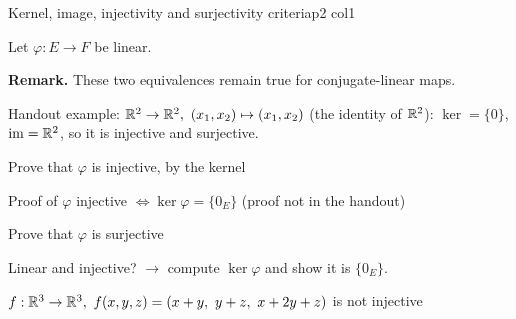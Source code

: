 \documentclass[course,noautoquant,noautokw]{neyvia-study}
\begin{document}
\begin{concept}[1.35]{Kernel, image, injectivity and surjectivity criteria}{p2 col1}
\begin{definition}
\noindent Let $\varphi:E\to F$ be linear.
\par\noindent \textbf{Remark.} These two equivalences remain true for conjugate-linear maps.
\par\noindent Handout example: $\R^2\to\R^2,\ (x_1,x_2)\mapsto(x_1,x_2)$ (the identity of $\mathbb{R}^2$): $\ker=\{0\}$, $\operatorname{im}=\mathbb{R}^2$, so it is injective and surjective.
\end{definition}
\begin{method}{Prove that $\varphi$ is injective, by the kernel}
\step{$\displaystyle \cdots$}
\end{method}
\begin{method}{Proof of $\varphi$ injective $\iff\ker\varphi=\{0_E\}$ (proof not in the handout)}
\end{method}
\begin{method}{Prove that $\varphi$ is surjective}
\end{method}
\begin{reflex}
Linear and injective? \ensuremath{\rightarrow} compute $\ker\varphi$ and show it is $\{0_E\}$.
\end{reflex}
\begin{worked}{$f:\R^3\to\R^3,\ f(x,y,z)=(x+y,\ y+z,\ x+2y+z)$ is not injective}

\end{worked}
\end{concept}
\end{document}

